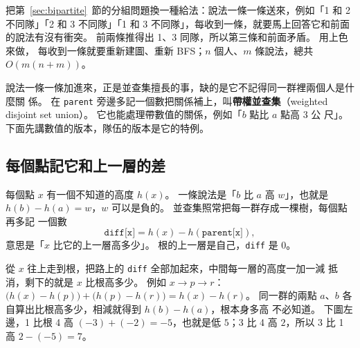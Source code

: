 把第~\ref{sec:bipartite}~節的分組問題換一種給法：說法一條一條送來，例如「1 和
2 不同隊」「2 和 3 不同隊」「1 和 3 不同隊」，每收到一條，就要馬上回答它和前面
的說法有沒有衝突。 前兩條推得出 1、3 同隊，所以第三條和前面矛盾。 用上色來做，
每收到一條就要重新建圖、重新 BFS；$n$ 個人、$m$ 條說法，總共 $O(m(n + m))$。

說法一條一條加進來，正是並查集擅長的事，缺的是它不記得同一群裡兩個人是什麼關
係。 在 \texttt{parent} 旁邊多記一個數把關係補上，叫\textbf{帶權並查集}（weighted
disjoint set union）。 它也能處理帶數值的關係，例如「$b$ 點比 $a$ 點高 $3$ 公
尺」。 下面先講數值的版本，隊伍的版本是它的特例。

\subsection{每個點記它和上一層的差}

每個點 $x$ 有一個不知道的高度 $h(x)$。 一條說法是「$b$ 比 $a$ 高 $w$」，也就是
$h(b) - h(a) = w$，$w$ 可以是負的。 並查集照常把每一群存成一棵樹，每個點再多記
一個數
\[
\texttt{diff[x]} = h(x) - h(\texttt{parent[x]}) ,
\]
意思是「$x$ 比它的上一層高多少」。 根的上一層是自己，\texttt{diff} 是 $0$。

從 $x$ 往上走到根，把路上的 \texttt{diff} 全部加起來，中間每一層的高度一加一減
抵消，剩下的就是 $x$ 比根高多少。 例如 $x \to p \to r$：
$\bigl(h(x) - h(p)\bigr) + \bigl(h(p) - h(r)\bigr) = h(x) - h(r)$。 同一群的兩點 $a$、$b$ 各自算出比根高多少，相減就得到 $h(b) - h(a)$，根本身多高
不必知道。 下圖左邊，1 比根 4 高 $(-3) + (-2) = -5$，也就是低 $5$；3 比 4 高
$2$，所以 3 比 1 高 $2 - (-5) = 7$。

\begin{center}
\label{fig:dsu-weights}
\end{center}

